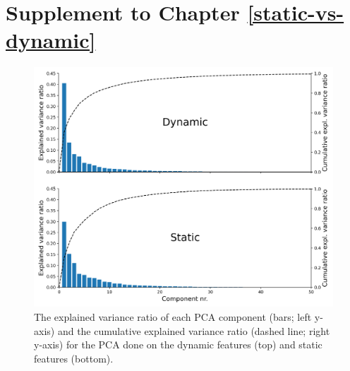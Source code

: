 \documentclass[11pt,american,]{memoir} %
\begin{document}
\hypertarget{static-vs-dynamic-supplement}{%
\chapter{Supplement to Chapter \ref{static-vs-dynamic}}\label{static-vs-dynamic-supplement}}

\begin{figure}
\centering
\includegraphics{_bookdown_files/static-vs-dynamic-files/figures/figure_S1.pdf}
\caption{\label{fig:fig-svsd-S1}The explained variance ratio of each PCA component (bars; left y-axis) and the cumulative explained variance ratio (dashed line; right y-axis) for the PCA done on the dynamic features (top) and static features (bottom).}
\end{figure}
\end{document}
